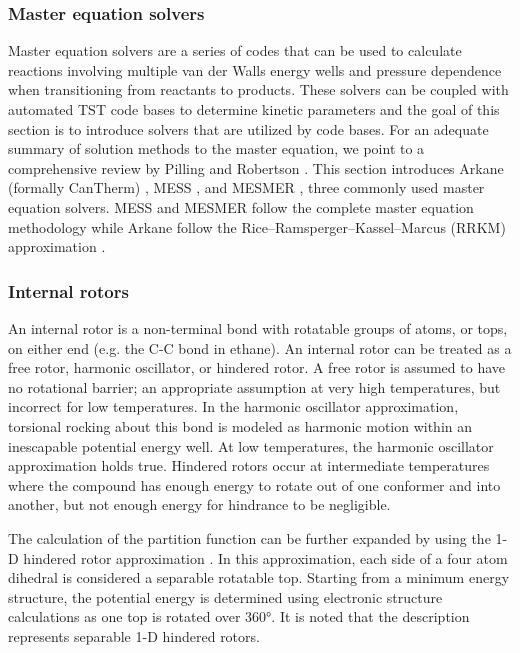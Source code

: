 \documentclass[preprint, 11pt]{elsarticle} %
\begin{document}
\subsubsection{Master equation solvers}


Master equation solvers are a series of codes that can be used to calculate reactions involving multiple van der Walls energy wells and pressure dependence when transitioning from reactants to products.
These solvers can be coupled with automated TST code bases to determine kinetic parameters and the goal of this section is to introduce solvers that are utilized by code bases. 
For an adequate summary of solution methods to the master equation, we point to a comprehensive review by Pilling and Robertson \cite{Pilling:2003}.
This section introduces Arkane (formally CanTherm) \cite{gao:2016}, MESS \cite{MESS:2013}, and MESMER \cite{MESMER:2012}, three commonly used master equation solvers. 
MESS and MESMER follow the complete master equation methodology \cite{truhlar:1996} while Arkane follow the Rice--Ramsperger--Kassel--Marcus (RRKM) approximation \cite{RRKM:1999}. 


\subsubsection{Internal rotors}

An internal rotor is a non-terminal bond with rotatable groups of atoms, or tops, on either end (e.g. the C-C bond in ethane). 
An internal rotor can be treated as a free rotor, harmonic oscillator, or hindered rotor.
A free rotor is assumed to have no rotational barrier; an appropriate assumption at very high temperatures, but incorrect for low temperatures.
In the harmonic oscillator approximation, torsional rocking about this bond is modeled as harmonic motion within an inescapable potential energy well.
At low temperatures, the harmonic oscillator approximation holds true. 
Hindered rotors occur at intermediate temperatures where the compound has enough energy to rotate out of one conformer and into another, but not enough energy for hindrance to be negligible.

The calculation of the partition function can be further expanded by using the 1-D hindered rotor approximation \cite{pfaendtner:2007}.
In this approximation, each side of a four atom dihedral is considered a separable rotatable top.
Starting from a minimum energy structure, the potential energy is determined using electronic structure calculations as one top is rotated over \ang{360}. 
It is noted that the description represents separable 1-D hindered rotors.
\end{document}
